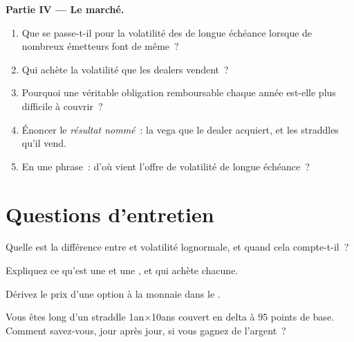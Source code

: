 \begin{problem}
\medskip\noindent\textbf{Partie IV --- Le marché.}
\begin{enumerate}[resume]
\item Que se passe-t-il pour la volatilité des  de longue échéance lorsque de nombreux émetteurs font de même~?
\item Qui achète la volatilité que les dealers vendent~?
\item Pourquoi une véritable obligation remboursable chaque année est-elle plus difficile à couvrir~?
\item Énoncer le \emph{résultat nommé}~: la vega que le dealer acquiert, et les
straddles qu'il vend.
\item En une phrase~: d'où vient l'offre de volatilité de longue échéance~?
\end{enumerate}
\end{problem}

\section{Questions d'entretien}

\begin{interviewq}\label{iq:m2:the-rates-options-market:1}
Quelle est la différence entre  et volatilité lognormale, et quand
cela compte-t-il~?
\end{interviewq}

\begin{interviewq}\label{iq:m2:the-rates-options-market:2}
Expliquez ce qu'est une  et une , et qui achète chacune.
\end{interviewq}

\begin{interviewq}\label{iq:m2:the-rates-options-market:3}
Dérivez le prix d'une option à la monnaie dans le .
\end{interviewq}

\begin{interviewq}\label{iq:m2:the-rates-options-market:4}
Vous êtes long d'un straddle 1an$\times$10ans couvert en delta à 95 points de base. Comment
savez-vous, jour après jour, si vous gagnez de l'argent~?
\end{interviewq}

